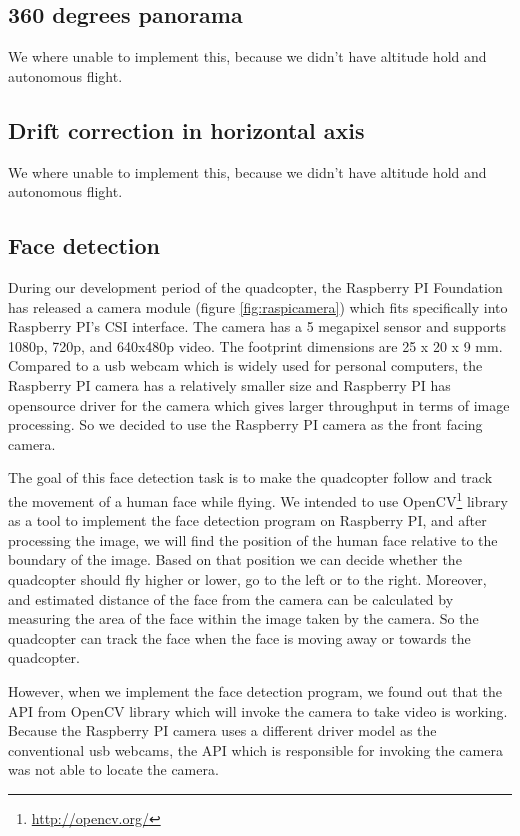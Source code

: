 \documentclass[11pt, a4paper, onecolumn, oneside, parskip=half]{scrartcl}
\begin{document}
\subsection{360 degrees panorama}
\label{sec:objectives:panorama}
We where unable to implement this, because we didn't have altitude hold and autonomous flight.

\subsection{Drift correction in horizontal axis}
\label{sec:objectives:drift}
We where unable to implement this, because we didn't have altitude hold and autonomous flight.

\subsection{Face detection}
\label{sec:objectives:face}
During our development period of the quadcopter, the Raspberry PI Foundation has released a camera module (figure \ref{fig:raspicamera}) which fits specifically into Raspberry PI's CSI interface. The camera has a 5 megapixel sensor and supports 1080p, 720p, and 640x480p video. The footprint dimensions are 25 x 20 x 9 mm. Compared to a usb webcam which is widely used for personal computers, the Raspberry PI camera has a relatively smaller size and Raspberry PI has opensource driver for the camera which gives larger throughput in terms of image processing. So we decided to use the Raspberry PI camera as the front facing camera.

The goal of this face detection task is to make the quadcopter follow and track the movement of a human face while flying. We intended to use OpenCV\footnote{\url{http://opencv.org/}} library as a tool to implement the face detection program on Raspberry PI, and after processing the image, we will find the position of the human face relative to the boundary of the image. Based on that position we can decide whether the quadcopter should fly higher or lower, go to the left or to the right. Moreover, and estimated distance of the face from the camera can be calculated by measuring the area of the face within the image taken by the camera. So the quadcopter can track the face when the face is moving away or towards the quadcopter.

However, when we implement the face detection program, we found out that the API from OpenCV library which will invoke the camera to take video is working. Because the Raspberry PI camera uses a different driver model as the conventional usb webcams, the API which is responsible for invoking the camera was not able to locate the camera.
\end{document}
